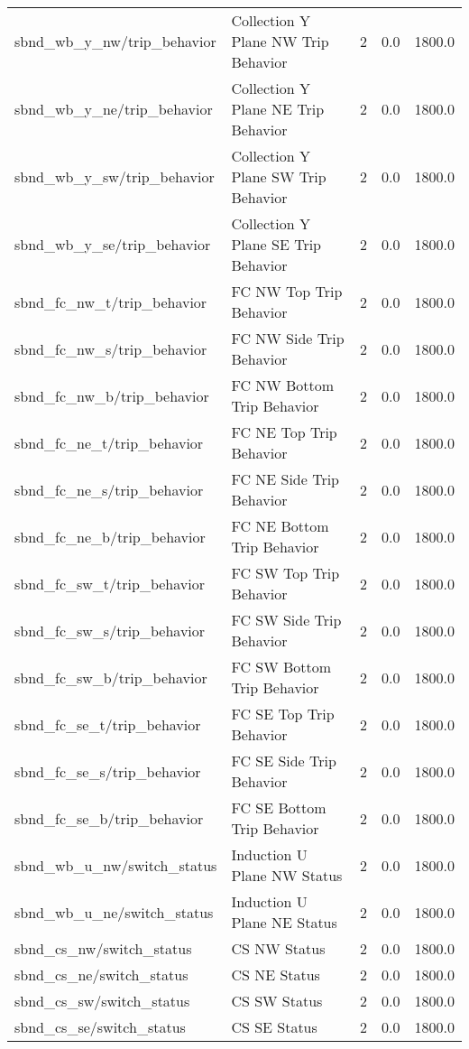 \begin{center}
\begin{longtable}{l | l l l l }
sbnd\_wb\_y\_nw/trip\_behavior & Collection Y Plane NW Trip Behavior & 2 & 0.0 & 1800.0\\ 
sbnd\_wb\_y\_ne/trip\_behavior & Collection Y Plane NE Trip Behavior & 2 & 0.0 & 1800.0\\ 
sbnd\_wb\_y\_sw/trip\_behavior & Collection Y Plane SW Trip Behavior & 2 & 0.0 & 1800.0\\ 
sbnd\_wb\_y\_se/trip\_behavior & Collection Y Plane SE Trip Behavior & 2 & 0.0 & 1800.0\\ 
sbnd\_fc\_nw\_t/trip\_behavior & FC NW Top Trip Behavior & 2 & 0.0 & 1800.0\\ 
sbnd\_fc\_nw\_s/trip\_behavior & FC NW Side Trip Behavior & 2 & 0.0 & 1800.0\\ 
sbnd\_fc\_nw\_b/trip\_behavior & FC NW Bottom Trip Behavior & 2 & 0.0 & 1800.0\\ 
sbnd\_fc\_ne\_t/trip\_behavior & FC NE Top Trip Behavior & 2 & 0.0 & 1800.0\\ 
sbnd\_fc\_ne\_s/trip\_behavior & FC NE Side Trip Behavior & 2 & 0.0 & 1800.0\\ 
sbnd\_fc\_ne\_b/trip\_behavior & FC NE Bottom Trip Behavior & 2 & 0.0 & 1800.0\\ 
sbnd\_fc\_sw\_t/trip\_behavior & FC SW Top Trip Behavior & 2 & 0.0 & 1800.0\\ 
sbnd\_fc\_sw\_s/trip\_behavior & FC SW Side Trip Behavior & 2 & 0.0 & 1800.0\\ 
sbnd\_fc\_sw\_b/trip\_behavior & FC SW Bottom Trip Behavior & 2 & 0.0 & 1800.0\\ 
sbnd\_fc\_se\_t/trip\_behavior & FC SE Top Trip Behavior & 2 & 0.0 & 1800.0\\ 
sbnd\_fc\_se\_s/trip\_behavior & FC SE Side Trip Behavior & 2 & 0.0 & 1800.0\\ 
sbnd\_fc\_se\_b/trip\_behavior & FC SE Bottom Trip Behavior & 2 & 0.0 & 1800.0\\ 
sbnd\_wb\_u\_nw/switch\_status & Induction U Plane NW Status & 2 & 0.0 & 1800.0\\ 
sbnd\_wb\_u\_ne/switch\_status & Induction U Plane NE Status & 2 & 0.0 & 1800.0\\ 
sbnd\_cs\_nw/switch\_status & CS NW Status & 2 & 0.0 & 1800.0\\ 
sbnd\_cs\_ne/switch\_status & CS NE Status & 2 & 0.0 & 1800.0\\ 
sbnd\_cs\_sw/switch\_status & CS SW Status & 2 & 0.0 & 1800.0\\ 
sbnd\_cs\_se/switch\_status & CS SE Status & 2 & 0.0 & 1800.0\\ 

\end{longtable}
\end{center}
